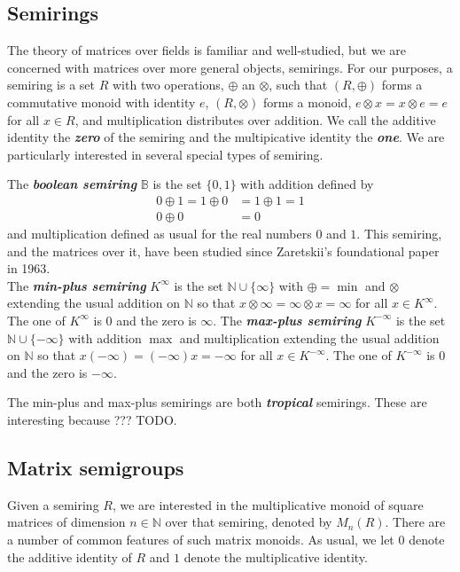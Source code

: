 \documentclass[11pt]{article}
\newcommand{\defn}[1]{\textbf{\textit{#1}}}
\numberwithin{equation}{section}
\newcommand{\B}{\mathbb{B}}
\newcommand{\N}{\mathbb{N}}
\begin{document}
\subsection{Semirings}
The theory of matrices over fields is familiar and well-studied, but we are
concerned with matrices over more general objects, semirings. For our purposes,
a semiring is a set $R$ with two operations, $\oplus$ an $\otimes$, such
that $(R, \oplus)$ forms a commutative monoid with identity $e$, $(R, \otimes)$ forms
a monoid, $e\otimes x = x\otimes e = e$ for all $x \in R$,  and multiplication
distributes over addition. We call the additive identity the \defn{zero} of the
semiring and the multipicative identity the \defn{one}. We are particularly
interested in several special types of semiring.

The \defn{boolean semiring} $\B$ is the set $\{0, 1\}$ with addition defined by 
\begin{align*}
  0 \oplus 1 = 1 \oplus 0 &= 1 \oplus 1 = 1 \\
  0 \oplus 0 &= 0
\end{align*}
and multiplication defined as usual for the real numbers $0$ and $1$. This
semiring, and the matrices over it, have been studied since Zaretskii's
foundational paper~\cite{Zaretskii1963aa} in 1963. \\

The \defn{min-plus semiring} $K^{\infty}$ is the set $\N \cup \{\infty\}$ with
$\oplus = \min$ and $\otimes$ extending the usual addition on $\N$ so that
$x\otimes\infty = \infty\otimes x = \infty$ for all $x \in K^{\infty}$. The one
of $K^{\infty}$ is $0$ and the zero is $\infty$. 
The \defn{max-plus semiring} $K^{-\infty}$ is the set $\N \cup \{-\infty\}$ with
addition $\max$ and multiplication extending the usual addition on $\N$ so
that $x(-\infty) = (-\infty) x = -\infty$ for all $x \in K^{-\infty}$. The one
of $K^{-\infty}$ is $0$ and the zero is $-\infty$.

The min-plus and max-plus semirings are both \defn{tropical} semirings. These
are interesting because ??? TODO.



\subsection{Matrix semigroups}
\label{sec:matsemigp}
Given a semiring $R$, we are interested in the multiplicative monoid of square
matrices of dimension $n \in \N$ over that semiring, denoted by $M_n(R)$.  There
are a number of common features of such matrix monoids. As usual, we let $0$
denote the additive identity of $R$ and $1$ denote the multiplicative identity.
\end{document}

